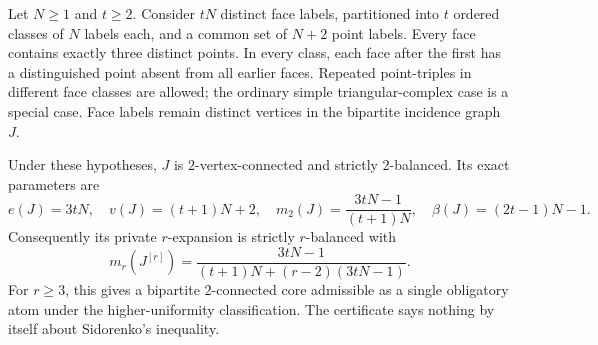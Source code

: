 Let $N\ge1$ and $t\ge2$. Consider $tN$ distinct face labels, partitioned
into $t$ ordered classes of $N$ labels each, and a common set of $N+2$
point labels. Every face contains exactly three distinct points. In every
class, each face after the first has a distinguished point absent from all
earlier faces. Repeated point-triples in different face classes are allowed;
the ordinary simple triangular-complex case is a special case. Face labels
remain distinct vertices in the bipartite incidence graph $J$.

\begin{proposition}
Under these hypotheses, $J$ is $2$-vertex-connected and strictly $2$-balanced.
Its exact parameters are
\[
 e(J)=3tN,\quad v(J)=(t+1)N+2,\quad
 m_2(J)=\frac{3tN-1}{(t+1)N},\quad
 \beta(J)=(2t-1)N-1.
\]
Consequently its private $r$-expansion is strictly $r$-balanced with
\[
 m_r(J^{[r]})=
 \frac{3tN-1}{(t+1)N+(r-2)(3tN-1)}.
\]
For $r\ge3$, this gives a bipartite $2$-connected core admissible as a
single obligatory atom under the higher-uniformity classification.
The certificate says nothing by itself about Sidorenko's inequality.
\end{proposition}

